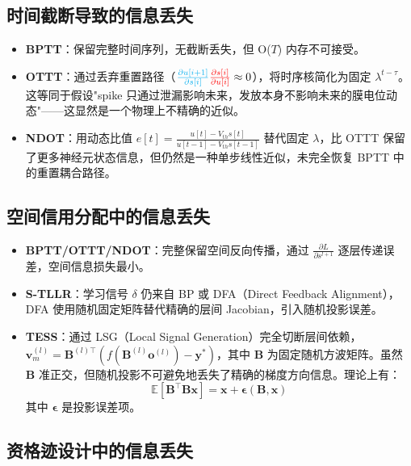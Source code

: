 \documentclass[journal,12pt,onecolumn]{IEEEtran}
\begin{document}
\subsection{时间截断导致的信息丢失}

\begin{itemize}
    \item \textbf{BPTT}：保留完整时间序列，无截断丢失，但 O($T$) 内存不可接受。
    \item \textbf{OTTT}：通过丢弃重置路径（${\color{cyan}\frac{\partial u[i+1]}{\partial s[i]}}{\color{red}\frac{\partial s[i]}{\partial u[i]}} \approx 0$），将时序核简化为固定 $\lambda^{t-\tau}$。这等同于假设"spike 只通过泄漏影响未来，发放本身不影响未来的膜电位动态"——这显然是一个物理上不精确的近似。
    \item \textbf{NDOT}：用动态比值 $e[t] = \frac{u[t] - V_{th}s[t]}{u[t-1] - V_{th}s[t-1]}$ 替代固定 $\lambda$，比 OTTT 保留了更多神经元状态信息，但仍然是一种单步线性近似，未完全恢复 BPTT 中的重置耦合路径。
\end{itemize}

\subsection{空间信用分配中的信息丢失}

\begin{itemize}
    \item \textbf{BPTT/OTTT/NDOT}：完整保留空间反向传播，通过 $\frac{\partial L}{\partial s^{l+1}}$ 逐层传递误差，空间信息损失最小。
    \item \textbf{S-TLLR}：学习信号 $\delta$ 仍来自 BP 或 DFA（Direct Feedback Alignment），DFA 使用随机固定矩阵替代精确的层间 Jacobian，引入随机投影误差。
    \item \textbf{TESS}：通过 LSG（Local Signal Generation）完全切断层间依赖，$\mathbf{v}_m^{(l)} = \mathbf{B}^{(l)\top}(f(\mathbf{B}^{(l)}\mathbf{o}^{(l)}) - \mathbf{y}^*)$，其中 $\mathbf{B}$ 为固定随机方波矩阵。虽然 $\mathbf{B}$ 准正交，但随机投影不可避免地丢失了精确的梯度方向信息。理论上有：
    \begin{equation}
    \mathbb{E}[\mathbf{B}^{\top}\mathbf{B}\mathbf{x}] = \mathbf{x} + \boldsymbol{\epsilon}(\mathbf{B}, \mathbf{x})
    \end{equation}
    其中 $\boldsymbol{\epsilon}$ 是投影误差项。
\end{itemize}

\subsection{资格迹设计中的信息丢失}
\end{document}
